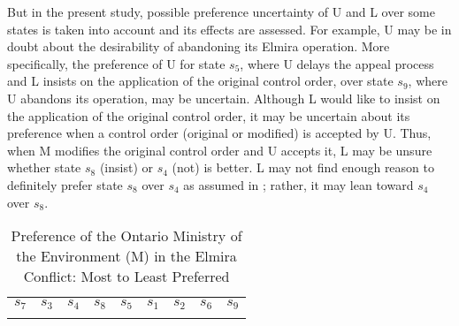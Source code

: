 But in the present study, possible preference uncertainty of U and L over some states is taken into account and its effects are assessed. For example, U may be in doubt about the desirability of abandoning its Elmira operation. More specifically, the preference of U for state $s_5$, where U delays the appeal process and L insists on the application of the original control order, over state $s_9$, where U abandons its operation, may be uncertain. Although L would like to insist on the application of the original control order, it may be uncertain about its preference when a control order (original or modified) is accepted by U. Thus, when M modifies the original control order and U accepts it, L may be unsure whether state $s_8$ (insist) or $s_4$ (not) is better. L may not find enough reason to definitely prefer state $s_8$ over $s_4$ as assumed in \citep{Hipel-et-al1993a, Hipel-et-al1999, Kilgour-et-al2001}; rather, it may lean toward $s_4$ over $s_8$.

\begin{table}[!t]
   \centering
   \caption{Preference of the Ontario Ministry of the Environment (M) in the Elmira Conflict: Most to Least Preferred}
   \setlength{\tabcolsep}{3pt}
   \renewcommand{\arraystretch}{1.3}
\begin{tabular}{x{10mm}x{10mm}x{10mm}x{10mm}x{10mm}x{10mm}x{10mm}x{10mm}x{10mm}}

   $s_7$ & $s_3$ & $s_4$ & $s_8$ & $s_5$ & $s_1$ & $s_2$ & $s_6$ & $s_9$ \\

\end{tabular}
\label{prfncs-MoE}
\end{table}


